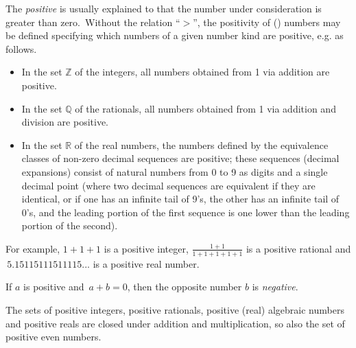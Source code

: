 \documentclass[12pt]{article}
\begin{document}

The  {\em positive} is usually explained to  that the number under consideration is greater than zero. \,Without the relation ``$>$'', the positivity of () numbers may be defined specifying which numbers of a given number kind are positive, e.g. as follows.

\begin{itemize}
\item In the set $\mathbb{Z}$ of the integers, all numbers obtained from 1 via addition are positive.
\item In the set $\mathbb{Q}$ of the rationals, all numbers obtained from 1 via addition and division are positive.
\item In the set $\mathbb{R}$ of the real numbers, the numbers defined by the equivalence classes of non-zero decimal sequences are positive; these sequences (decimal expansions) consist of natural numbers from 0 to 9 as digits and a single decimal point (where two decimal sequences are equivalent if they are identical, or if one has an infinite tail of 9's, the other has an infinite tail of 0's, and the leading portion of the first sequence is one lower than the leading portion of the second).
\end{itemize}

For example, $1+1+1$ is a positive integer, $\frac{1+1}{1+1+1+1+1}$ is a positive rational and \,$5.15115111511115...$ is a positive real number.

If $a$ is positive and \,$a+b = 0$, then the opposite number $b$ is {\em negative}.

The sets of positive integers, positive rationals, positive (real) algebraic numbers and positive reals are closed under addition and  multiplication, so also the set of positive even numbers.


\end{document}
